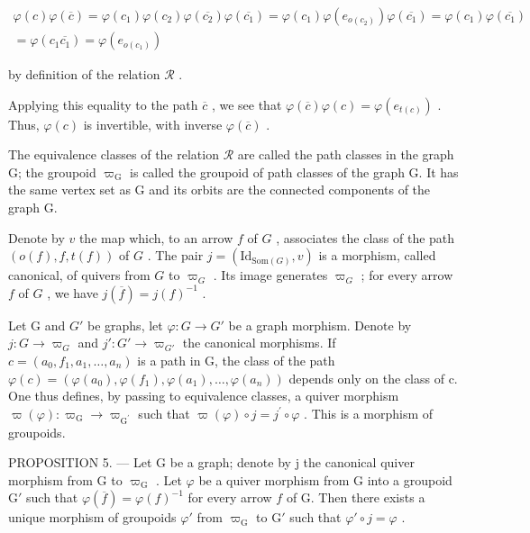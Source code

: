 \[
\begin{array}{c} \varphi (c) \varphi (\overline {{c}}) = \varphi (c _ {1}) \varphi (c _ {2}) \varphi (\overline {{c _ {2}}}) \varphi (\overline {{c _ {1}}}) = \varphi (c _ {1}) \varphi (e _ {o (c _ {2})}) \varphi (\overline {{c _ {1}}}) = \varphi (c _ {1}) \varphi (\overline {{c _ {1}}}) \\ = \varphi (c _ {1} \overline {{c _ {1}}}) = \varphi (e _ {o (c _ {1})}) \end{array}
\]

by definition of the relation \(\mathcal{R}\) .

Applying this equality to the path \(\overline{c}\) , we see that \(\varphi(\overline{c})\varphi(c)=\varphi(e_{t(c)})\) . Thus, \(\varphi(c)\) is invertible, with inverse \(\varphi(\overline{c})\) .

The equivalence classes of the relation \(\mathcal{R}\) are called the path classes in the graph G; the groupoid \(\varpi_{\mathrm{G}}\) is called the groupoid of path classes of the graph G. It has the same vertex set as G and its orbits are the connected components of the graph G.

Denote by \(v\) the map which, to an arrow \(f\) of \(G\) , associates the class of the path \((o(f), f, t(f))\) of \(G\) . The pair \(j = (\mathrm{Id}_{\mathrm{Som}(G)}, v)\) is a morphism, called canonical, of quivers from \(G\) to \(\varpi_G\) . Its image generates \(\varpi_G\) ; for every arrow \(f\) of \(G\) , we have \(j(\overline{f}) = j(f)^{-1}\) .

Let G and \(G'\) be graphs, let \(\varphi\colon G \to G'\) be a graph morphism. Denote by \(j\colon G \to \varpi_{G}\) and \(j'\colon G' \to \varpi_{G'}\) the canonical morphisms. If \(c = (a_0, f_1, a_1, \ldots, a_n)\) is a path in G, the class of the path \(\varphi(c) = (\varphi(a_0), \varphi(f_1), \varphi(a_1), \ldots, \varphi(a_n))\) depends only on the class of c. One thus defines, by passing to equivalence classes, a quiver morphism \(\varpi(\varphi)\colon\varpi_{\mathrm{G}}\to\varpi_{\mathrm{G}^{\prime}}\) such that \(\varpi(\varphi)\circ j=j^{\prime}\circ\varphi\) . This is a morphism of groupoids.

PROPOSITION 5. — Let G be a graph; denote by j the canonical quiver morphism from G to \(\varpi_{\mathrm{G}}\) . Let \(\varphi\) be a quiver morphism from G into a groupoid \(\mathrm{G}'\) such that \(\varphi(\overline{f}) = \varphi(f)^{-1}\) for every arrow \(f\) of G. Then there exists a unique morphism of groupoids \(\varphi'\) from \(\varpi_{\mathrm{G}}\) to \(\mathrm{G}'\) such that \(\varphi' \circ j = \varphi\) .


